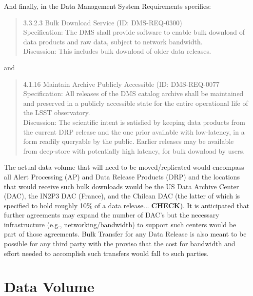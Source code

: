 And finally, in the Data Management System Requirements  specifies:
\begin{quote}
3.3.2.3 Bulk Download Service (ID: DMS-REQ-0300)\\
Specification: The DMS shall provide software to enable bulk download of data products 
and raw data, subject to network bandwidth.\\
Discussion: This includes bulk download of older data releases.
\end{quote}

and 

\begin{quote}
4.1.16 Maintain Archive Publicly Accessible (ID: DMS-REQ-0077 \\
Specification: All releases of the DMS catalog archive shall be maintained and preserved 
in a publicly accessible state for the entire operational life of the LSST observatory.\\
Discussion: The scientific intent is satisfied by keeping data products from the current 
DRP release and the one prior available with low-latency, in a form readily queryable by 
the public. Earlier releases may be available from deep-store with potentially high latency, 
for bulk download by users.
\end{quote}

The actual data volume that will need to be moved/replicated would encompass all Alert 
Processing (AP) and Data Release Products (DRP) and the locations that would receive such bulk 
downloads would be the US Data Archive Center (DAC), the IN2P3 DAC (France), and the Chilean DAC 
(the latter of which is specified to hold roughly 10\% of a data release... {\bf CHECK}).  
It is anticipated that further agreements may expand the number of DAC's but the necessary 
infrastructure (e.g., networking/bandwidth) to support such centers would be part of those 
agreements.  Bulk Transfer for any Data Release is also meant to be possible for any third 
party with the proviso that the cost for bandwidth and effort needed to accomplish such 
transfers would fall to such parties.


\section{Data Volume\label{sec_scale}}

